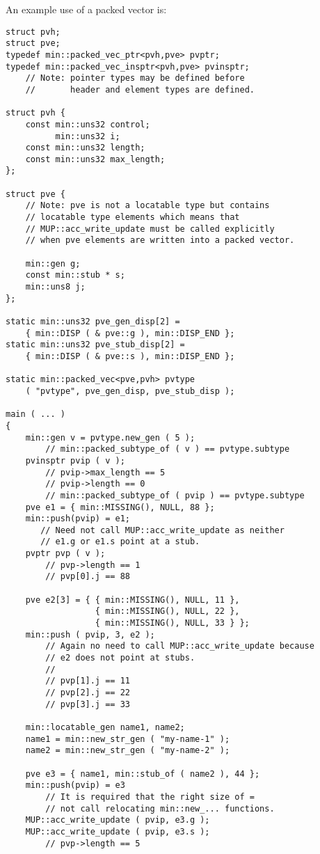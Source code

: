 \documentclass[12pt]{article}
\newenvironment{indpar}[1][0.3in]%
	{\begin{list}{}%
		     {\setlength{\itemsep}{0in}%
		      \setlength{\topsep}{0in}%
		      \setlength{\parsep}{1ex}%
		      \setlength{\labelwidth}{#1}%
		      \setlength{\leftmargin}{#1}%
		      \addtolength{\leftmargin}{\labelsep}}%
	 \item}%
	{\end{list}}
\begin{document}
An example use of a packed vector is:
\begin{indpar}\begin{verbatim}
struct pvh;
struct pve;
typedef min::packed_vec_ptr<pvh,pve> pvptr;
typedef min::packed_vec_insptr<pvh,pve> pvinsptr;
    // Note: pointer types may be defined before
    //       header and element types are defined.

struct pvh {
    const min::uns32 control;
          min::uns32 i;
    const min::uns32 length;
    const min::uns32 max_length;
};

struct pve {
    // Note: pve is not a locatable type but contains
    // locatable type elements which means that
    // MUP::acc_write_update must be called explicitly
    // when pve elements are written into a packed vector.

    min::gen g;
    const min::stub * s;
    min::uns8 j;
};

static min::uns32 pve_gen_disp[2] =
    { min::DISP ( & pve::g ), min::DISP_END };
static min::uns32 pve_stub_disp[2] =
    { min::DISP ( & pve::s ), min::DISP_END };

static min::packed_vec<pve,pvh> pvtype
    ( "pvtype", pve_gen_disp, pve_stub_disp );

main ( ... )
{
    min::gen v = pvtype.new_gen ( 5 );
        // min::packed_subtype_of ( v ) == pvtype.subtype
    pvinsptr pvip ( v );
        // pvip->max_length == 5
        // pvip->length == 0
        // min::packed_subtype_of ( pvip ) == pvtype.subtype
    pve e1 = { min::MISSING(), NULL, 88 };
    min::push(pvip) = e1;
       // Need not call MUP::acc_write_update as neither
       // e1.g or e1.s point at a stub.
    pvptr pvp ( v );
        // pvp->length == 1
        // pvp[0].j == 88

    pve e2[3] = { { min::MISSING(), NULL, 11 },
                  { min::MISSING(), NULL, 22 },
                  { min::MISSING(), NULL, 33 } };
    min::push ( pvip, 3, e2 );
        // Again no need to call MUP::acc_write_update because
        // e2 does not point at stubs.
        //
        // pvp[1].j == 11
        // pvp[2].j == 22
        // pvp[3].j == 33

    min::locatable_gen name1, name2;
    name1 = min::new_str_gen ( "my-name-1" );
    name2 = min::new_str_gen ( "my-name-2" );

    pve e3 = { name1, min::stub_of ( name2 ), 44 };
    min::push(pvip) = e3
        // It is required that the right size of =
        // not call relocating min::new_... functions.
    MUP::acc_write_update ( pvip, e3.g ); 
    MUP::acc_write_update ( pvip, e3.s ); 
        // pvp->length == 5


\end{verbatim}
\end{indpar}
\end{document}
